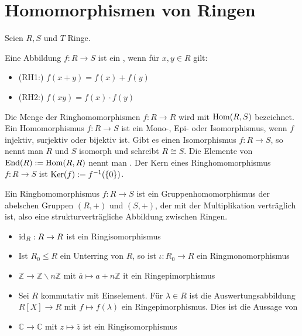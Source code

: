 \section{Homomorphismen von Ringen}

Seien $R,S$ und $T$ Ringe.

\begin{definition}[Ringhomomorphismus]
	Eine Abbildung $f:R\to S$ ist ein , wenn für $x,y\in R$ 
	gilt:
	\begin{itemize}
		\item (RH1:) $f(x+y)=f(x)+f(y)$
		\item (RH2:) $f(xy)=f(x)\cdot f(y)$
	\end{itemize}
	Die Menge der Ringhomomorphismen $f:R\to R$ wird mit $\operatorname{Hom}(R,S)$ bezeichnet. Ein Homomorphismus $f:R\to S$ ist ein 
	Mono-, Epi- oder Isomorphismus, wenn $f$ injektiv, surjektiv oder bijektiv ist. Gibt es einen Isomorphismus 
	$f:R\to S$, so nennt man $R$ und $S$ isomorph und schreibt $R\cong S$. Die Elemente von $\operatorname{End}(R):= \operatorname{Hom}(R,R)$ nennt 
	man . Der Kern eines Ringhomomorphismus $f:R\to S$ ist $\operatorname{Ker}(f):= f^{-1}(\{0\})$.
\end{definition}

\begin{remark}
	Ein Ringhomomorphismus $f:R\to S$ ist ein Gruppenhomomorphismus der abelschen Gruppen $(R,+)$ und 
	$(S,+)$, der mit der Multiplikation verträglich ist, also eine strukturverträgliche Abbildung zwischen Ringen.
\end{remark}

\begin{example}
	\begin{itemize}
		\item $\operatorname{id}_R:R\to R$ ist ein Ringisomorphismus
		\item Ist $R_0\le R$ ein Unterring von $R$, so ist $\iota: R_0 \to R$ ein Ringmonomorphismus
		\item $\mathbb Z \to \mathbb Z\backslash n\mathbb Z$ mit $\overline a\mapsto a+n\mathbb Z$ it ein Ringepimorphismus
		\item Sei $R$ kommutativ mit Einselement. Für $\lambda\in R$ ist die Auswertungsabbildung $R[X]\to R$ mit $f\mapsto 
		f(\lambda)$ ein Ringepimorphismus. Dies ist die Aussage von 
		\item $\mathbb C \to \mathbb C$ mit $z\mapsto \overline z$ ist ein Ringisomorphismus
	\end{itemize}
\end{example}

